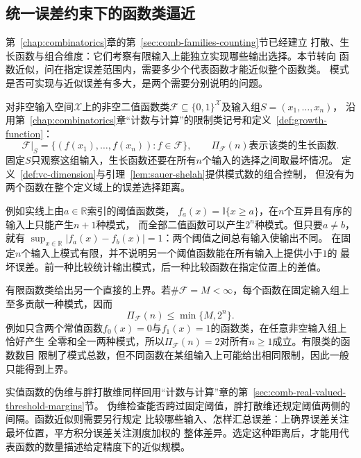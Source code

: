 \subsection{统一误差约束下的函数类逼近}
\label{sec:functional-covering-metric-entropy}
\label{sec:functional-combinatorial-metric-complexity}

\label{sec:functional-sequential-classes-low-rank}

第~\ref{chap:combinatorics}章的第~\ref{sec:comb-families-counting}节已经建立
打散、生长函数与组合维度：它们考察有限输入上能独立实现哪些输出选择。本节转向
函数近似，问在指定误差范围内，需要多少个代表函数才能近似整个函数类。
模式是否可实现与近似误差有多大，是两个需要分别说明的问题。

对非空输入空间$\mathcal X$上的非空二值函数类$\mathcal F\subseteq\{0,1\}^{\mathcal X}$及输入组$S=(x_1,\ldots,x_n)$，
沿用第~\ref{chap:combinatorics}章“计数与计算”的限制类记号和定义~\ref{def:growth-function}：
\begin{equation}
 \mathcal F|_S=\{(f(x_1),\ldots,f(x_n)):f\in\mathcal F\},
 \qquad \Pi_{\mathcal F}(n)\text{表示该类的生长函数}.
 \label{eq:functional-growth-function}
\end{equation}
固定$S$只观察这组输入，生长函数还要在所有$n$个输入的选择之间取最坏情况。
定义~\ref{def:vc-dimension}与引理~\ref{lem:sauer-shelah}提供模式数的组合控制，
但没有为两个函数在整个定义域上的误差选择距离。

例如实线上由$a\in\mathbb R$索引的阈值函数类，
$f_a(x)=\mathbb{I}\{x\geq a\}$，在$n$个互异且有序的输入上只能产生$n+1$种模式，
而全部二值函数可以产生$2^n$种模式。但只要$a\neq b$，就有
$\sup_{x\in\mathbb R}|f_a(x)-f_b(x)|=1$：两个阈值之间总有输入使输出不同。
在固定$n$个输入上模式有限，并不说明另一个阈值函数能在所有输入上提供小于$1$的
最坏误差。前一种比较统计输出模式，后一种比较函数在指定位置上的差值。

有限函数类给出另一个直接的上界。若$\#\mathcal{F}=M<\infty$，每个函数在固定输入组上
至多贡献一种模式，因而
\[
  \Pi_{\mathcal{F}}(n)\leq\min\{M,2^n\}.
\]
例如只含两个常值函数$f_0(x)=0$与$f_1(x)=1$的函数类，在任意非空输入组上恰好产生
全零和全一两种模式，所以$\Pi_{\mathcal{F}}(n)=2$对所有$n\geq1$成立。有限类的函数数目
限制了模式总数，但不同函数在某组输入上可能给出相同限制，因此一般只能得到上界。

实值函数的伪维与胖打散维同样回用“计数与计算”章的第~\ref{sec:comb-real-valued-threshold-margins}节。
伪维检查能否跨过固定阈值，胖打散维还规定阈值两侧的间隔。函数近似则需要另行规定
比较哪些输入、怎样汇总误差：上确界误差关注最坏位置，平方积分误差关注测度加权的
整体差异。选定这种距离后，才能用代表函数的数量描述给定精度下的近似规模。



